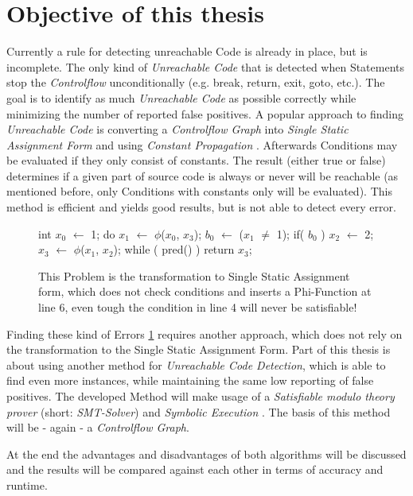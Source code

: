 \section{Objective of this thesis}
Currently a rule for detecting unreachable Code is already in place, but is incomplete.
The only kind of \emph{Unreachable Code} that is detected when Statements stop the \emph{Controlflow} unconditionally (e.g. break, return, exit, goto, etc.).
The goal is to identify as much \emph{Unreachable Code} as possible correctly while minimizing the number of reported false positives.
A popular approach to finding \emph{Unreachable Code} is converting a \emph{Controlflow Graph} into \emph{Single Static Assignment Form} and using \emph{Constant Propagation} \cite{Click_1995}.
Afterwards Conditions may be evaluated if they only consist of constants. The result (either true or false) determines if a given part of source code is always or never will be reachable (as mentioned before, only Conditions with constants only will be evaluated).
This method is efficient and yields good results, but is not able to detect every error.
\begin{figure}
    \begin{GenericCode}
    int $x_0$ $\leftarrow$ 1;
    do { $x_1$ $\leftarrow$ $\phi$($x_0$, $x_3$);
        $b_0$ $\leftarrow$ ($x_{1}$ $\neq$ 1);
        if( $b_0$ )
            $x_2$ $\leftarrow$ 2;
        $x_3$ $\leftarrow$ $\phi$($x_1$, $x_2$);
    } while ( pred() )
    return $x_3$;
    \end{GenericCode}
    \caption{This Problem \cite{Click_1995} is the transformation to Single Static Assignment form, which does not check conditions and inserts a Phi-Function at line 6, even tough the condition in line 4 will never be satisfiable!}
    \label{code:ssa-defect}
\end{figure}
Finding these kind of Errors \ref{code:ssa-defect} requires another approach, which does not rely on the transformation to the Single Static Assignment Form.
Part of this thesis is about using another method for \emph{Unreachable Code Detection}, which is able to find even more instances, while maintaining the same low reporting of false positives.
The developed Method will make usage of a \emph{Satisfiable modulo theory prover} (short: \emph{SMT-Solver}) and \emph{Symbolic Execution} . The basis of this method will be - again - a \emph{Controlflow Graph}.

At the end the advantages and disadvantages of both algorithms will be discussed and the results will be compared against each other in terms of accuracy and runtime.



